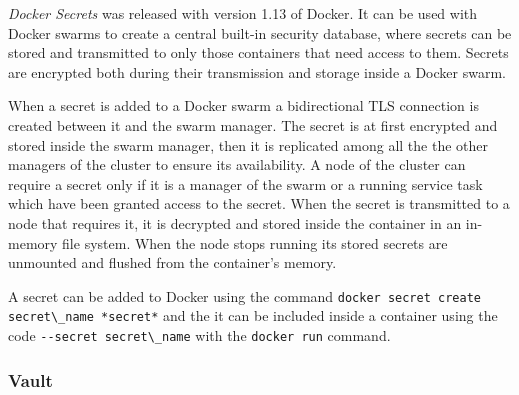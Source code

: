 \documentclass[a4paper,12pt]{article}
\newcommand{\code}[1]{\lstinline|#1|}
\begin{document}
\textit{Docker Secrets} was released with version 1.13 of Docker. It can be used
with Docker swarms to create a central built-in security database, where secrets
can be stored and transmitted to only those containers that need access to them.
Secrets are encrypted both during their transmission and storage inside a Docker
swarm. \par When a secret is added to a Docker swarm a bidirectional TLS
connection is created between it and the swarm manager. The secret is at first
encrypted and stored inside the swarm manager, then it is replicated among all
the the other managers of the cluster to ensure its availability. A node of the
cluster can require a secret only if it is a manager of the swarm or a running
service task which have been granted access to the secret. When the secret is
transmitted to a node that requires it, it is decrypted and stored inside the
container in an in-memory file system. When the node stops running its stored
secrets are unmounted and flushed from the container's memory.\par A secret can
be added to Docker using the command \code{docker secret create secret\_name
*secret*} and the it can be included inside a container using the code
\code{--secret secret\_name} with the \code{docker run} command.

\subsubsection{Vault}
\end{document}
